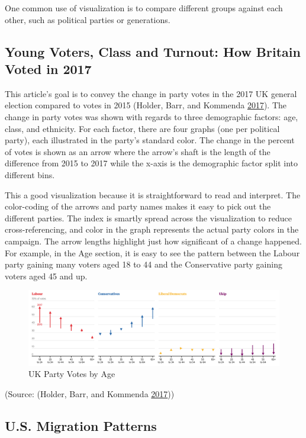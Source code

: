 \documentclass[]{book}
\begin{document}
One common use of visualization is to compare different groups against
each other, such as political parties or generations.

\subsection{Young Voters, Class and Turnout: How Britain Voted in
2017}\label{young-voters-class-and-turnout-how-britain-voted-in-2017}

This article's goal is to convey the change in party votes in the 2017
UK general election compared to votes in 2015 (Holder, Barr, and
Kommenda \protect\hyperlink{ref-UKvotes2017}{2017}). The change in party
votes was shown with regards to three demographic factors: age, class,
and ethnicity. For each factor, there are four graphs (one per political
party), each illustrated in the party's standard color. The change in
the percent of votes is shown as an arrow where the arrow's shaft is the
length of the difference from 2015 to 2017 while the x-axis is the
demographic factor split into different bins.

This a good visualization because it is straightforward to read and
interpret. The color-coding of the arrows and party names makes it easy
to pick out the different parties. The index is smartly spread across
the visualization to reduce cross-referencing, and color in the graph
represents the actual party colors in the campaign. The arrow lengths
highlight just how significant of a change happened. For example, in the
Age section, it is easy to see the pattern between the Labour party
gaining many voters aged 18 to 44 and the Conservative party gaining
voters aged 45 and up.

\begin{figure}
\centering
\includegraphics{images/Party_Votes_by_Age.png}
\caption{UK Party Votes by Age}
\end{figure}

(Source: (Holder, Barr, and Kommenda
\protect\hyperlink{ref-UKvotes2017}{2017}))

\subsection{U.S. Migration Patterns}\label{u.s.-migration-patterns}
\end{document}
